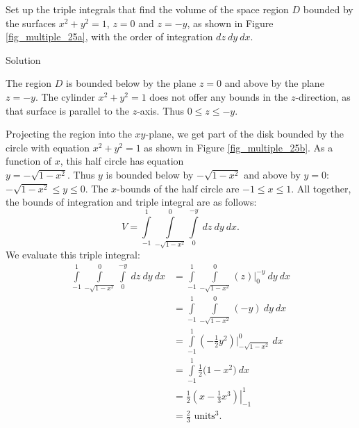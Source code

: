 \begin{example}
\label{ex_trip3}

Set up the triple integrals that find the volume of the space region $D$ bounded by the surfaces $x^2+y^2=1$, $z=0$ and $z=-y$, as shown in Figure \ref{fig_multiple_25a}, with the order of integration $dz\ dy\ dx$. %




Solution 

The region $D$ is bounded below by the plane $z=0$ and above by the plane $z=-y$. The cylinder $x^2+y^2=1$ does not offer any bounds in the $z$-direction, as that surface is parallel to the $z$-axis. Thus $0\leq z\leq -y$.

Projecting the region into the $xy$-plane, we get part of the disk bounded by the circle with equation $x^2+y^2=1$ as shown in Figure \ref{fig_multiple_25b}. As a function of $x$, this half circle has equation \\ $y=-\sqrt{1-x^2}$. Thus $y$ is bounded below by $-\sqrt{1-x^2}$ and above by $y=0$: $-\sqrt{1-x^2}\leq y\leq 0$. The $x$-bounds of the half circle are $-1\leq x\leq 1$. All together, the bounds of integration and triple integral are  as follows:
$$V = \int\limits_{-1}^1\int\limits_{-\sqrt{1-x^2}}^{0}\int\limits_0^{-y}\ dz\ dy\ dx.$$
We evaluate this triple integral:
\allowdisplaybreaks
\begin{align*}
\int\limits_{-1}^1\int\limits_{-\sqrt{1-x^2}}^{0}\int\limits_0^{-y}\ dz\ dy\ dx 
                &= \int\limits_{-1}^1\int\limits_{-\sqrt{1-x^2}}^{0}\left(z\right)\Big|_{0}^{-y}\ dy\ dx\\
                &= \int\limits_{-1}^1\int\limits_{-\sqrt{1-x^2}}^{0}(-y)\ dy\ dx\\
				&=\int\limits_{-1}^1\left(-\frac12y^2\right)\Bigg|_{-\sqrt{1-x^2}}^{0}\ dx\\
				&= \int\limits_{-1}^1 \frac12\big(1-x^2\big)\ dx\\
				&= \left.\frac12\left(x-\frac13x^3\right)\right|_{-1}^1\\
				&= \frac23\text{ units}^3.
\end{align*}




\end{example}
